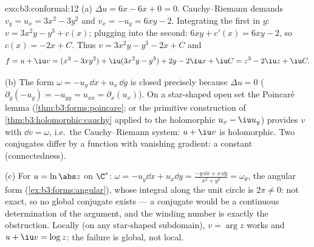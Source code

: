 \begin{solution}{exo:b3:conformal:12}
(a) $\Delta u = 6x - 6x + 0 = 0$. Cauchy--Riemann demands
$v_y = u_x = 3x^2 - 3y^2$ and $v_x = -u_y = 6xy - 2$.
Integrating the first in $y$: $v = 3x^2y - y^3 + c(x)$;
plugging into the second: $6xy + c'(x) = 6xy - 2$, so $c(x)
= -2x + C$. Thus $v = 3x^2y - y^3 - 2x + C$ and
\[
f = u + \iu v = (x^3 - 3xy^2) + \iu(3x^2y - y^3)
+ 2y - 2\iu x + \iu C = z^3 - 2\iu z + \iu C .
\]

(b) The form $\omega = -u_y\,\dd x + u_x\,\dd y$ is closed
precisely because $\Delta u = 0$ ($\partial_y(-u_y) =
-u_{yy} = u_{xx} = \partial_x(u_x)$). On a star-shaped open
set the Poincar\'e lemma (\cref{thm:b3:forms:poincare}; or
the primitive construction of
\cref{thm:b3:holomorphic:cauchy} applied to the holomorphic
$u_x - \iu u_y$) provides $v$ with $\dd v = \omega$, i.e.\
the Cauchy--Riemann system: $u + \iu v$ is holomorphic. Two
conjugates differ by a function with vanishing gradient: a
constant (connectedness).

(c) For $u = \ln\abs z$ on $\C^*$: $\omega = -u_y\dd x +
u_x\dd y = \frac{-y\,\dd x + x\,\dd y}{x^2 + y^2} =
\omega_\theta$, the angular form
(\cref{ex:b3:forms:angular}), whose integral along the unit
circle is $2\pi \neq 0$: not exact, so no global conjugate
exists --- a conjugate would be a continuous determination
of the argument, and the winding number is exactly the
obstruction. Locally (on any star-shaped subdomain), $v =
\arg z$ works and $u + \iu v = \log z$: the failure is
global, not local.
\end{solution}

